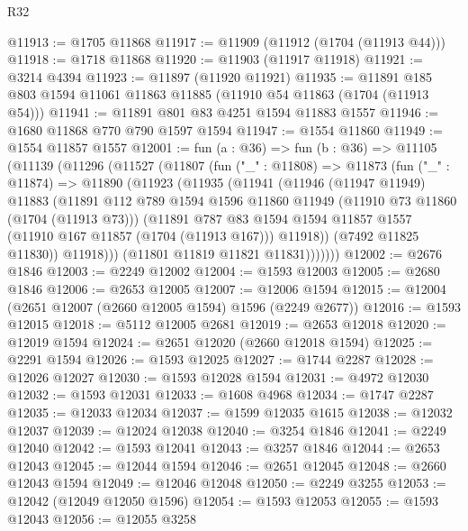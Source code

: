 \begin{lexlean}{R32}
\begin{coremodule}
@11913 := @1705 @11868
@11917 := @11909 (@11912 (@1704 (@11913 @44)))
@11918 := @1718 @11868
@11920 := @11903 (@11917 @11918)
@11921 := @3214 @4394
@11923 := @11897 (@11920 @11921)
@11935 := @11891 @185 @803 @1594 @11061 @11863 @11885 (@11910 @54 @11863 (@1704 (@11913 @54)))
@11941 := @11891 @801 @83 @4251 @1594 @11883 @1557
@11946 := @1680 @11868 @770 @790 @1597 @1594
@11947 := @1554 @11860
@11949 := @1554 @11857 @1557
@12001 := fun (a : @36) =>
  fun (b : @36) =>
  @11105
    (@11139
      (@11296
        (@11527
          (@11807
            (fun ("_" : @11808) =>
            @11873
              (fun ("_" : @11874) =>
              @11890
                (@11923
                  (@11935
                    (@11941
                      (@11946
                        (@11947 @11949)
                        @11883
                        (@11891
                          @112
                          @789
                          @1594
                          @1596
                          @11860
                          @11949
                          (@11910 @73 @11860 (@1704 (@11913 @73)))
                          (@11891
                            @787
                            @83
                            @1594
                            @1594
                            @11857
                            @1557
                            (@11910 @167 @11857 (@1704 (@11913 @167)))
                            @11918))
                        (@7492 @11825 @11830))
                      @11918)))
                (@11801 @11819 @11821 @11831)))))))
@12002 := @2676 @1846
@12003 := @2249 @12002
@12004 := @1593 @12003
@12005 := @2680 @1846
@12006 := @2653 @12005
@12007 := @12006 @1594
@12015 := @12004 (@2651 @12007 (@2660 @12005 @1594) @1596 (@2249 @2677))
@12016 := @1593 @12015
@12018 := @5112 @12005 @2681
@12019 := @2653 @12018
@12020 := @12019 @1594
@12024 := @2651 @12020 (@2660 @12018 @1594)
@12025 := @2291 @1594
@12026 := @1593 @12025
@12027 := @1744 @2287
@12028 := @12026 @12027
@12030 := @1593 @12028 @1594
@12031 := @4972 @12030
@12032 := @1593 @12031
@12033 := @1608 @4968
@12034 := @1747 @2287
@12035 := @12033 @12034
@12037 := @1599 @12035 @1615
@12038 := @12032 @12037
@12039 := @12024 @12038
@12040 := @3254 @1846
@12041 := @2249 @12040
@12042 := @1593 @12041
@12043 := @3257 @1846
@12044 := @2653 @12043
@12045 := @12044 @1594
@12046 := @2651 @12045
@12048 := @2660 @12043 @1594
@12049 := @12046 @12048
@12050 := @2249 @3255
@12053 := @12042 (@12049 @12050 @1596)
@12054 := @1593 @12053
@12055 := @1593 @12043
@12056 := @12055 @3258

\end{coremodule}
\end{lexlean}

